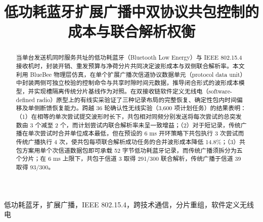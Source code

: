 \documentclass[conference]{IEEEtran}
\begin{document}
\title{低功耗蓝牙扩展广播中双协议共包控制的成本与联合解析权衡}

\author{
}

\maketitle

\begin{abstract}
当单台发送机同时服务共址的低功耗蓝牙（Bluetooth Low Energy）与 IEEE 802.15.4 接收机时，封装开销、重发预算与净荷分片共同决定波形成本与双侧联合解析率。本文利用 BlueBee 物理层仿真，在单个扩展广播次信道协议数据单元（protocol data unit）中封装两侧可独立校验的控制命令与共享时隙时间元数据，推导闭合形式的波形成本模型，并实现槽隔离传统分片基线作为对照。在双接收链软件定义无线电（software-defined radio）原型上的有线实采验证了三种记录布局的完整恢复、确定性包内时间偏移及单侧断馈恢复能力。跨越 36 轮确认性无线实验（3,600 项计划任务）的结果表明：（1）在相等的单次尝试提交波形时长下，共包相对同频分别发送将每次尝试的总突发数由 3 个减至 2 个，而计划尝试内联合解析率未呈一致增益；（2）对于短记录，传统广播在单次尝试时合并单位成本最低，但在预设的 6 ms 开环策略下共包执行 3 次尝试而传统广播执行 4 次，使共包每项联合解析成功任务的合并波形成本降低 14.8\%；（3）共包方案用单个次信道数据包即可承载 52 字节低功耗蓝牙记录，而传统广播须拆分为五个分片；在 6 ms 上限下，共包于信道 3 取得 291/300 联合解析，传统广播于信道 39 取得 93/300。
\end{abstract}

\begin{IEEEkeywords}
低功耗蓝牙，扩展广播，IEEE 802.15.4，跨技术通信，分片重组，软件定义无线电
\end{IEEEkeywords}


% 







\end{document}
